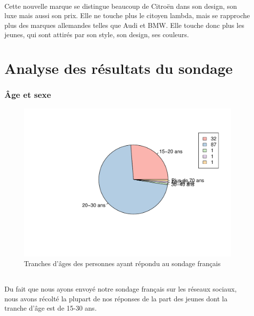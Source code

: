 \documentclass[12pt]{article}\usepackage[]{graphicx}\usepackage[]{color}
\makeatletter
\def\maxwidth{ %
  \ifdim\Gin@nat@width>\linewidth
    \linewidth
  \else
    \Gin@nat@width
  \fi
}
\newenvironment{knitrout}{}{} %
\makeatother
\begin{document}
\paragraph{} Cette nouvelle marque se distingue beaucoup de Citroën dans son
design, son luxe mais aussi son prix. Elle ne touche plus le citoyen lambda,
mais se rapproche plus des marques allemandes telles que Audi et BMW. Elle
touche donc plus les jeunes, qui sont attirés par son style, son design, ses
couleurs.

\break
\part{Analyse des résultats du sondage}

\section{Âge et sexe}



\begin{knitrout}
\color{fgcolor}\begin{figure}[H]
\includegraphics[width=\maxwidth]{figure/tranche_age_fr-1} \caption[Tranches d'âges des personnes ayant répondu au sondage français]{Tranches d'âges des personnes ayant répondu au sondage français}\label{fig:tranche age fr}
\end{figure}


\end{knitrout}
\paragraph{} Du fait que nous ayons envoyé notre sondage français sur les
réseaux sociaux, nous avons récolté la plupart de nos réponses de la part des
jeunes dont la tranche d'âge est de 15-30 ans.
\end{document}
